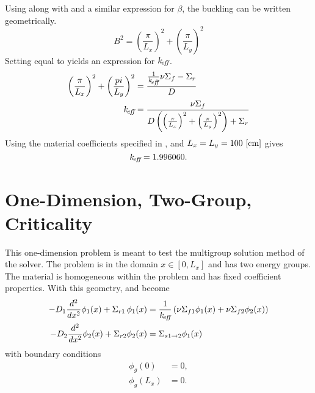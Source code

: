   Using  along with  and a
  similar expression for $\beta$, the buckling can be written geometrically.
  \begin{equation}
    \label{eq:2d1g_buckle_geom}
    B^2 = \left(\frac{\pi}{L_x}\right)^2 + \left(\frac{\pi}{L_y}\right)^2
  \end{equation}
  Setting  equal to  yields an
  expression for $k_{\!\mbox{\scriptsize \em eff}}$.
  \begin{align}
    \left(\frac{\pi}{L_x}\right)^2 + \left(\frac{pi}{L_y}\right)^2 &=
      \frac{\frac{1}{k_{\!\mbox{\scriptsize \em eff}}} \nu \Sigma_f - \Sigma_r}{D} \\
    k_{\!\mbox{\scriptsize \em eff}} &= \frac{\nu \Sigma_f}{D \left( \left(\frac{\pi}{L_x}\right)^2 + 
      \left( \frac{\pi}{L_y}\right)^2 \right) + \Sigma_r}
  \end{align}
  Using the material coefficients specified in , and
  $L_x=L_y=100 \,\left[\text{{cm}}\right]$ gives 
  \begin{equation}
    \label{eq:keff2d}
    k_{\!\mbox{\scriptsize \em eff}} = 1.996060.
  \end{equation}
  
\section{One-Dimension, Two-Group, Criticality}
  \label{sec:deriv_1d2g}
  This one-dimension problem is meant to test the multigroup solution method of
  the solver. The problem is in the domain $x \in [0,L_x]$ and has two energy
  groups. The material is homogeneous within the problem and has fixed
  coefficient properties. With this geometry,  and
   become
  \begin{align}
    \label{eq:1d2g_1}
    - D_1 \frac{d^2}{dx^2} \phi_1(x) + \Sigma_{r1} \, \phi_1(x) &= 
      \frac{1}{k_{\!\mbox{\scriptsize \em eff}}} \left( \nu \Sigma_{f1} \phi_1(x) + \nu \Sigma_{f2}
      \phi_2(x) \right) \\
    \label{eq:1d2g_2}
    -D_2 \frac{d^2}{dx^2} \phi_2(x) + \Sigma_{r2} \phi_2(x) &= 
      \Sigma_{s 1 \rightarrow 2} \phi_1(x)
  \end{align}
  with boundary conditions
  \begin{align}
    \label{eq:1d2g_bc0}
    \phi_g(0) &= 0 ,\\
    \label{eq:1d2g_bcLx}
    \phi_g(L_x) &= 0.
  \end{align}
  
